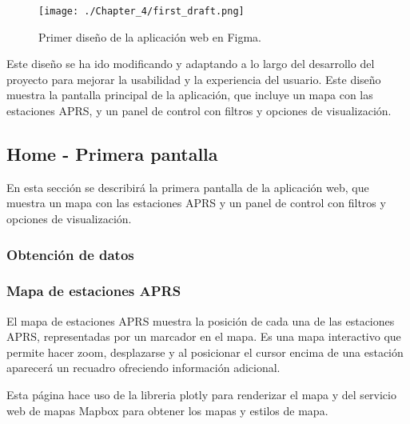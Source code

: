 \begin{figure}[h]
	\centering
	\texttt{[image: ./Chapter\_4/first\_draft.png]}
	\caption{Primer diseño de la aplicación web en Figma.}
	\label{fig:figma}
\end{figure}

Este diseño se ha ido modificando y adaptando a lo largo del desarrollo del proyecto para mejorar la usabilidad y la experiencia del usuario. Este diseño muestra la pantalla principal de la aplicación, que incluye un mapa con las estaciones APRS, y un panel de control con filtros y opciones de visualización.

\subsection{Home - Primera pantalla}
En esta sección se describirá la primera pantalla de la aplicación web, que muestra un mapa con las estaciones APRS y un panel de control con filtros y opciones de visualización.
\subsubsection{Obtención de datos}
\subsubsection{Mapa de estaciones APRS}
El mapa de estaciones APRS muestra la posición de cada una de las estaciones APRS, representadas por un marcador en el mapa. Es una mapa interactivo que permite hacer zoom, desplazarse y al posicionar el cursor encima de una estación aparecerá un recuadro ofreciendo información adicional.

Esta página hace uso de la libreria plotly para renderizar el mapa y del servicio web de mapas Mapbox para obtener los mapas y estilos de mapa.

